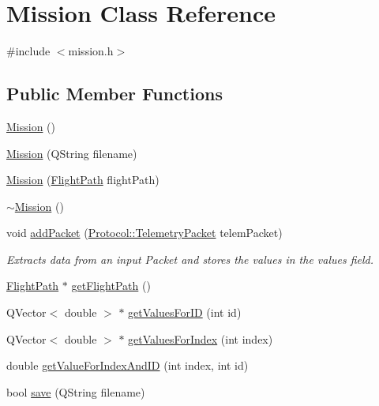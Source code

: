 \hypertarget{class_mission}{}\section{Mission Class Reference}
\label{class_mission}


{\ttfamily \#include $<$mission.\+h$>$}

\subsection*{Public Member Functions}
\begin{DoxyCompactItemize}
\item 
\hyperlink{class_mission_aa5a6ff4fc779338ab01b8f6dd470f4df}{Mission} ()
\item 
\hyperlink{class_mission_a3c1cb92197018f64854514616b43f06b}{Mission} (Q\+String filename)
\item 
\hyperlink{class_mission_a68bf8cba0c882169d26fb4bcb80c228c}{Mission} (\hyperlink{class_flight_path}{Flight\+Path} flight\+Path)
\item 
\hyperlink{class_mission_ad1a61b34162393ac42be5955d9772921}{$\sim$\+Mission} ()
\item 
void \hyperlink{class_mission_aba7aac52c4313705452dabcce0a6a0d2}{add\+Packet} (\hyperlink{class_protocol_1_1_telemetry_packet}{Protocol\+::\+Telemetry\+Packet} telem\+Packet)
\begin{DoxyCompactList}\small\item\em Extracts data from an input Packet and stores the values in the values field. \end{DoxyCompactList}\item 
\hyperlink{class_flight_path}{Flight\+Path} $\ast$ \hyperlink{class_mission_ae6034451524e6b87062fcb62c89ae458}{get\+Flight\+Path} ()
\item 
Q\+Vector$<$ double $>$ $\ast$ \hyperlink{class_mission_ac6cf2cd13b5be62dec02a4edaba1be25}{get\+Values\+For\+I\+D} (int id)
\item 
Q\+Vector$<$ double $>$ $\ast$ \hyperlink{class_mission_a4377102f1abe6a9f2767fa09a9a8f64e}{get\+Values\+For\+Index} (int index)
\item 
double \hyperlink{class_mission_ad2cd66901a48bbb2e042cd14740b3cba}{get\+Value\+For\+Index\+And\+I\+D} (int index, int id)
\item 
bool \hyperlink{class_mission_a8e02183538b8e0095f7a6e609149f75d}{save} (Q\+String filename)
\end{DoxyCompactItemize}


